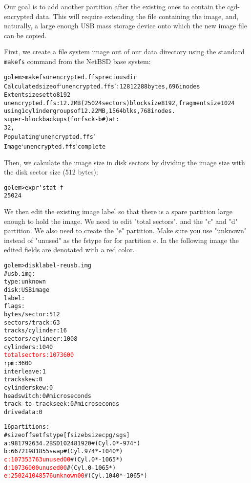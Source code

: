 Our goal is to add another partition after the existing ones to
contain the cgd-encrypted data.  This will require extending the
file containing the image, and, naturally, a large enough USB mass
storage device onto which the new image file can be copied.

First, we create a file system image out of our data directory
using the standard \texttt{makefs} command from the NetBSD base
system:

{\footnotesize
\begin{alltt}
golem> makefs unencrypted.ffs preciousdir
Calculated size of `unencrypted.ffs': 12812288 bytes, 696 inodes
Extent size set to 8192
unencrypted.ffs: 12.2MB (25024 sectors) block size 8192, fragment size 1024
        using 1 cylinder groups of 12.22MB, 1564 blks, 768 inodes.
super-block backups (for fsck -b #) at:
 32,
Populating `unencrypted.ffs'
Image `unencrypted.ffs' complete
\end{alltt}}

Then, we calculate the image size in disk sectors by dividing the
image size with the disk sector size (512 bytes):

{\footnotesize
\begin{alltt}
golem> expr `stat -f %z unencrypted.ffs` / 512
25024
\end{alltt}}

We then edit the existing image label so that there is a spare
partition large enough to hold the image.  We need to edit "total
sectors", and the "c" and "d" partition.  We also need to create
the "e" partition.  Make sure you use "unknown" instead of "unused"
as the fstype for for partition e.  In the following image the
edited fields are denotated with a red color.

{\footnotesize
\begin{alltt}
golem> disklabel -re usb.img 
# usb.img:
type: unknown
disk: USB image
label: 
flags:
bytes/sector: 512
sectors/track: 63
tracks/cylinder: 16
sectors/cylinder: 1008
cylinders: 1040
\textcolor{red}{total sectors: 1073600}
rpm: 3600
interleave: 1
trackskew: 0
cylinderskew: 0
headswitch: 0           # microseconds
track-to-track seek: 0  # microseconds
drivedata: 0 

16 partitions:
#        size    offset     fstype [fsize bsize cpg/sgs]
 a:    981792        63     4.2BSD   1024  8192     0  # (Cyl.      0*-    974*)
 b:     66721    981855       swap                     # (Cyl.    974*-   1040*)
 \textcolor{red}{c:   1073537        63     unused      0     0}        # (Cyl.      0*-   1065*)
 \textcolor{red}{d:   1073600         0     unused      0     0}        # (Cyl.      0 -   1065*)
 \textcolor{red}{e:     25024   1048576    unknown      0     0}        # (Cyl.   1040*-   1065*)
\end{alltt}}

